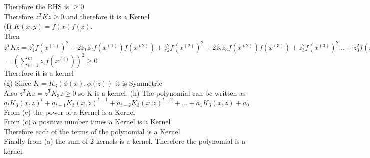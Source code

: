 \begin{answer}
Therefore the RHS is $\geq 0$\\
Therefore $z^TKz \geq 0$ and therefore it is a Kernel\\ 
(f) $K(x,y)=f(x)f(z)$.\\
Then $z^TKz=z_1^2f(x^{(1)})^2+2z_1z_2f(x^{(1)})f(x^{(2)})+z_2^2f(x^{(2)})^2+2z_2z_3f(x^{(2)})f(x^{(3)})+z_3^2f(x^{(3)})^2 \dots +z_3^2f(x^{(3)})^2$\\
$=(\sum_{i=1}^{m}z_i f(x^{(i)}))^2 \geq 0$\\
Therefore it is a kernel\\
(g) Since $K=K_3(\phi(x),\phi(z))$ it is Symmetric\\
Also $z^TKz=z^TK_3z \geq 0$ so K is a kernel.
(h) The polynomial can be written as $a_tK_3(x,z)^t+a_{t-1}K_3(x,z)^{t-1}+a_{t-2}K_3(x,z)^{t-2}+\dots+a_1K_3(x,z)+a_0$\\
From (e) the power of a Kernel is a Kernel\\
From (c) a positive number times a Kernel is a Kernel\\
Therefore each of the terms of the polynomial is a Kernel\\
Finally from (a) the sum of 2 kernels is a kernel. Therefore the polynomial is a kernel.
\end{answer}